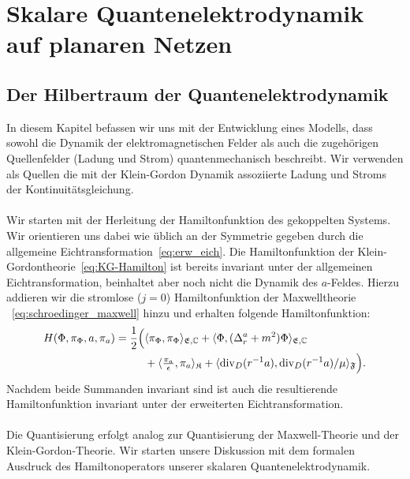 \documentclass[11pt,a4paper,leqno]{report}
\numberwithin{equation}{chapter}
\begin{document}
 \chapter{Skalare Quantenelektrodynamik auf planaren Netzen}\label{chap:QED}
 \section{Der Hilbertraum der Quantenelektrodynamik}
In diesem Kapitel befassen wir uns mit der Entwicklung eines Modells, dass sowohl die Dynamik der elektromagnetischen Felder als auch die zugehörigen Quellenfelder (Ladung und Strom) quantenmechanisch beschreibt. Wir verwenden als Quellen die mit der Klein-Gordon Dynamik assoziierte Ladung und Stroms der Kontinuitätsgleichung.
\\
\\
Wir starten mit der Herleitung der Hamiltonfunktion des gekoppelten Systems. Wir orientieren uns dabei wie üblich an der Symmetrie gegeben durch die allgemeine Eichtransformation~\eqref{eq:erw_eich}. Die Hamiltonfunktion der Klein-Gordontheorie~\eqref{eq:KG-Hamilton} ist bereits invariant unter der allgemeinen Eichtransformation, beinhaltet aber noch nicht die Dynamik des $a$-Feldes. Hierzu addieren wir die stromlose (\(j=0\)) Hamiltonfunktion der Maxwelltheorie ~\eqref{eq:schroedinger_maxwell} hinzu und erhalten folgende Hamiltonfunktion:
 \begin{align}\label{eq:QED-Hamilton-klassisch}
 	\begin{split}
 		H(\Phi, \pi_\Phi, a, \pi_a) = \frac{1}{2}\Bigl(&\langle \pi_\Phi, \pi_\Phi \rangle_{\mathfrak{E},\mathbb{C}} + \langle \Phi, (\Delta_r^a + m^2)\Phi \rangle_{\mathfrak{E},\mathbb{C}} \\
 		&+ \langle \tfrac{\pi_a}{\epsilon}, \pi_a \rangle_{\mathfrak{K}} + \langle \mathrm{div}_D(r^{-1}a), \mathrm{div}_D(r^{-1}a)/\mu \rangle_{\mathfrak{F}}\Bigr).
 	\end{split}
 \end{align}
 \noindent
 Nachdem beide Summanden invariant sind ist auch die resultierende Hamiltonfunktion invariant unter der erweiterten Eichtransformation.
\\
\\
 Die Quantisierung erfolgt analog zur Quantisierung der Maxwell-Theorie und der Klein-Gordon-Theorie. Wir starten unsere Diskussion mit dem formalen Ausdruck des Hamiltonoperators unserer skalaren Quantenelektrodynamik.
\end{document}
